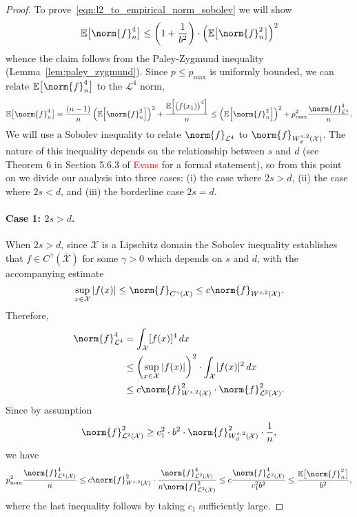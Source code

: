\documentclass{article}
\newcommand{\abs}[1]{\left \lvert #1 \right \rvert}
\newcommand{\1}{\mathbf{1}}
\newcommand{\Xset}{\mathcal{X}}
\newcommand{\Ebb}{\mathbb{E}}
\newcommand{\Leb}{\mathcal{L}}
\theoremstyle{alden}
\theoremstyle{aldenthm}
\theoremstyle{definition}
\theoremstyle{remark}
\begin{document}
\begin{proof}
	To prove~\eqref{eqn:l2_to_empirical_norm_sobolev} we will show
	\begin{equation*}
	\mathbb{E}\bigl[\norm{f}_n^4\bigr] \leq \left(1 + \frac{1}{b^2}\right)\cdot \left(\mathbb{E}\bigl[\norm{f}_n^2\bigr]\right)^2
	\end{equation*}
	whence the claim follows from the Paley-Zygmund inequality (Lemma~\ref{lem:paley_zygmund}). Since $p \leq p_{\max}$ is uniformly bounded, we can relate $\mathbb{E}\bigl[\norm{f}_n^4\bigr]$ to the $\Leb^4$ norm,
	\begin{equation*}
	\mathbb{E}\bigl[\norm{f}_n^4\bigr] = \frac{(n-1)}{n}\left(\mathbb{E}\Bigl[\norm{f}_n^2\Bigr]\right)^2 + \frac{\mathbb{E}\Bigl[\bigl(f(x_1)\bigr)^4\Bigr]}{n} \leq \left(\mathbb{E}\Bigl[\norm{f}_n^2\Bigr]\right)^2 + p_{\max}^2\frac{\norm{f}_{\Leb^4}^4}{n}.
	\end{equation*}
	We will use a Sobolev inequality to relate $\norm{f}_{\Leb^4}$ to $\norm{f}_{W_d^{s,2}(\Xset)}$. The nature of this inequality depends on the relationship between $s$ and $d$ (see Theorem 6 in Section 5.6.3 of \textcolor{red}{Evans} for a formal statement), so from this point on we divide our analysis into three cases: (i) the case where $2s > d$, (ii) the case where $2s < d$, and (iii) the borderline case $2s = d$.
	
	\paragraph{Case 1: $2s > d$.}
	When $2s > d$, since $\Xset$ is a Lipschitz domain the Sobolev inequality establishes that $f \in C^{\gamma}(\overline{\Xset})$ for some $\gamma > 0$ which depends on $s$ and $d$, with the accompanying estimate
	\begin{equation*}
	\sup_{x \in \Xset} \abs{f(x)} \leq \norm{f}_{C^{\gamma}(\Xset)} \leq c \norm{f}_{W^{s,2}(\Xset)}.
	\end{equation*}
	Therefore,
	\begin{align*}
	\norm{f}_{\Leb^4}^4 & = \int_{\Xset} [f(x)]^4 \,dx \\
	& \leq \left(\sup_{x \in \Xset} \abs{f(x)}\right)^2 \cdot \int_{\Xset} [f(x)]^2 \,dx \\
	& \leq c \norm{f}_{W^{s,2}(\Xset)}^2 \cdot \norm{f}_{\Leb^2(\Xset)}^2.
	\end{align*}
	Since by assumption
	\begin{equation*}
	\norm{f}_{\Leb^2(\Xset)}^2 \geq c_1^2 \cdot b^2 \cdot \norm{f}_{W_d^{s,2}(\Xset)}^2 \cdot \frac{1}{n},
	\end{equation*}
	we have
	\begin{equation*}
	p_{\max}^2\frac{\norm{f}_{\Leb^4(\Xset)}^4}{n} \leq c \norm{f}_{W^{s,2}(\Xset)}^2 \cdot \frac{\norm{f}_{\Leb^2(\Xset)}^4}{n \norm{f}_{\Leb^2(\Xset)}^2} \leq c \frac{\norm{f}_{\Leb^2(\Xset)}^4}{c_1^2 b^2} \leq \frac{\Ebb\bigl[\norm{f}_n^2\bigr]}{b^2},
	\end{equation*}
	where the last inequality follows by taking $c_1$ sufficiently large.
	

\end{proof}
\end{document}
